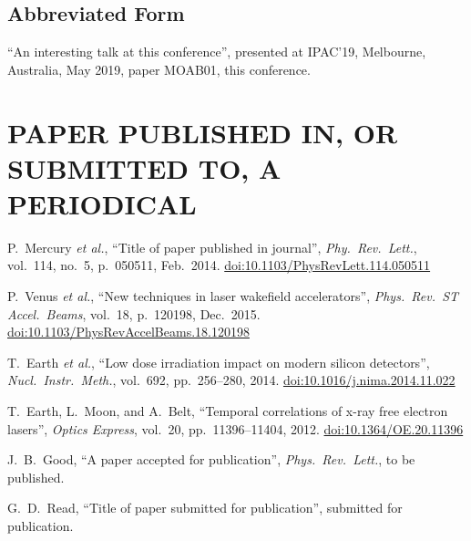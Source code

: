 \subsection{Abbreviated Form}

\begin{thebibliography}{9} %
\setcounter{enumi}{4}
	“An interesting talk at this conference”,
	presented at IPAC’19, Melbourne, Australia, May 2019, 
	paper MOAB01, this conference.
\end{thebibliography}


\vspace*{-.5\baselineskip}
\section{PAPER PUBLISHED IN, OR SUBMITTED TO, A PERIODICAL}

\begin{thebibliography}{99} %
  \setcounter{enumi}{5}
		P.~Mercury \emph{et al.},
		“Title of paper published in journal”,
		\emph{Phy.\ Rev.\ Lett.}, vol.\ 114, no.\ 5,
		p.\ 050511, Feb.\ 2014.
		\url{doi:10.1103/PhysRevLett.114.050511}

		P.~Venus \emph{et al.},
		“New techniques in laser wakefield accelerators”,
		\emph{Phys.\ Rev.\ ST Accel.\ Beams}, vol.\ 18,
		p.\ 120198, Dec.~2015. %
		\url{doi:10.1103/PhysRevAccelBeams.18.120198} 

		T.~Earth \emph{et al.},
		“Low dose irradiation impact on modern silicon detectors”,
		\emph{Nucl.\ Instr.\ Meth.}, vol.\ 692, pp.\ 256--280, 2014.
		\url{doi:10.1016/j.nima.2014.11.022}
	
		T.~Earth, L.~Moon, and A.~Belt,
		“Temporal correlations of x-ray free electron lasers”,
		\emph{Optics Express}, vol.\ 20, pp.\ 11396--11404, 2012.
		\url{doi:10.1364/OE.20.11396}

		J.~B.~Good,
		“A paper accepted for publication”,
		\emph{Phys.\ Rev.\ Lett.}, to be published.

		G.~D.~Read,
		“Title of paper submitted for publication”,
		submitted for publication.
\end{thebibliography}

